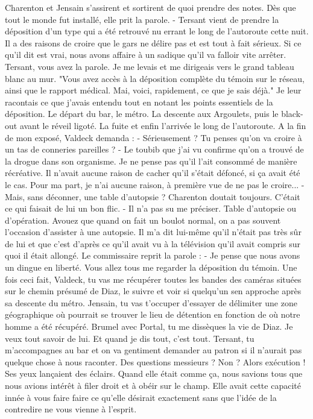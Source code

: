 Charenton et Jensain s'assirent et sortirent de quoi prendre des notes. Dès que tout le monde fut installé, elle prit la
parole.
- Tersant vient de prendre la déposition d'un type qui a été retrouvé nu errant le long de l'autoroute cette nuit. Il a
des raisons de croire que le gars ne délire pas et est tout à fait sérieux. Si ce qu'il dit est vrai, nous avons affaire
à un sadique qu'il va falloir vite arrêter. Tersant, vous avez la parole.
Je me levais et me dirigeais vers le grand tableau blanc au mur. "Vous avez accès à la déposition complète du témoin sur
le réseau, ainsi que le rapport médical. Mai, voici, rapidement, ce que je sais déjà." Je leur racontais ce que j'avais
entendu tout en notant les points essentiels de la déposition. Le départ du bar, le métro. La descente aux Argoulets,
puis le black-out avant le réveil ligoté. La fuite et enfin l'arrivée le long de l'autoroute.
A la fin de mon exposé, Valdeck demanda :
- Sérieusement ? Tu penses qu'on va croire à un tas de conneries pareilles ?
- Le toubib que j'ai vu confirme qu'on a trouvé de la drogue dans son organisme. Je ne pense pas qu'il l'ait consommé de
manière récréative. Il n'avait aucune raison de  cacher qu'il s'était défoncé, si ça avait été le cas. Pour ma part, je
n'ai aucune raison, à première vue de ne pas le croire...
- Mais, sans déconner, une table d'autopsie ? Charenton doutait toujours. C'était ce qui faisait de lui un bon flic.
- Il n'a pas su me préciser. Table d'autopsie ou d'opération. Avouez que quand on fait un boulot normal, on a pas
souvent l'occasion d'assister à une autopsie. Il m'a dit lui-même qu'il n'était pas très sûr de lui et que c'est d'après
ce qu'il avait vu à la télévision qu'il avait compris sur quoi il était allongé.
Le commissaire reprit la parole :
- Je pense que nous avons un dingue en liberté. Vous allez tous me regarder la déposition du témoin. Une fois ceci fait,
Valdeck, tu vas me récupérer toutes les bandes des caméras situées sur le chemin présumé de Diaz, le suivre et voir si
quelqu'un sen approche après sa descente du métro. Jensain, tu vas t'occuper d'essayer de délimiter une zone
géographique où pourrait se trouver le lieu de détention en fonction de où notre homme a été récupéré. Brumel avec
Portal, tu me dissèques la vie de Diaz. Je veux tout savoir de lui. Et quand je dis tout, c'est tout. Tersant, tu
m'accompagnes au bar et on va gentiment demander au patron si il n'aurait pas quelque chose à nous raconter. Des
questions messieurs ? Non ? Alors exécution !
Ses yeux lançaient des éclairs. Quand elle était comme ça, nous savions tous que nous avions intérêt à filer droit et à
obéir sur le champ. Elle avait cette capacité innée à vous faire faire ce qu'elle désirait exactement sans que l'idée de
la contredire ne vous vienne à l'esprit. 

